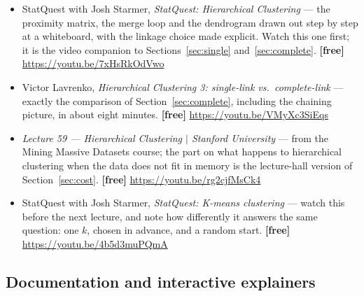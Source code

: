 \documentclass[11pt]{article}
\begin{document}
\begin{itemize}[leftmargin=*]
  \item StatQuest with Josh Starmer, \emph{StatQuest: Hierarchical Clustering}
    --- the proximity matrix, the merge loop and the dendrogram drawn out step
    by step at a whiteboard, with the linkage choice made explicit. Watch this
    one first; it is the video companion to Sections~\ref{sec:single}
    and~\ref{sec:complete}. \textbf{[free]} \url{https://youtu.be/7xHsRkOdVwo}
  \item Victor Lavrenko, \emph{Hierarchical Clustering 3: single-link vs.\
    complete-link} --- exactly the comparison of Section~\ref{sec:complete},
    including the chaining picture, in about eight minutes.
    \textbf{[free]} \url{https://youtu.be/VMyXc3SiEqs}
  \item \emph{Lecture 59 --- Hierarchical Clustering $|$ Stanford University}
    --- from the Mining Massive Datasets course; the part on what happens to
    hierarchical clustering when the data does not fit in memory is the
    lecture-hall version of Section~\ref{sec:cost}. \textbf{[free]}
    \url{https://youtu.be/rg2cjfMsCk4}
  \item StatQuest with Josh Starmer, \emph{StatQuest: K-means clustering} ---
    watch this before the next lecture, and note how differently it answers
    the same question: one $k$, chosen in advance, and a random start.
    \textbf{[free]} \url{https://youtu.be/4b5d3muPQmA}
\end{itemize}

\subsection*{Documentation and interactive explainers}
\end{document}
